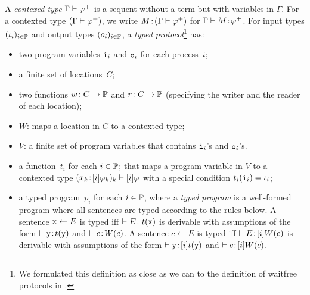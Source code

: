 A \textit{contexed type}
 $\Gamma\vdash{\varphi}^+$ is a sequent without a term but with variables in
 $\Gamma$.
For a contexted type $(\Gamma\vdash{\varphi}^+)$,
we write ${M} \mathord{\colon\kern -2pt}{(\Gamma\vdash{\varphi}^+)}$ for
$\Gamma\vdash{M} \mathord{\colon\kern -2pt}{{\varphi}^+}$.
For input types $(\iota_i)_{i\in\mathbb{P}}$
and output types $(o_i)_{i\in\mathbb{P}}$,
a \textit{typed protocol}\footnote{We formulated this definition
 as close as we can to the definition of waitfree protocols in \citet[\textbf{2.3.}]{saks2000wait}.} has:
\begin{itemize}
 \item two program variables
      $\texttt{i}_i$ and $\texttt{o}_i$ for each process~$i$;
 \item a finite set of locations~$C$;
 \item two functions $w\colon C\rightarrow \mathbb{P}$
       and $r\colon C\rightarrow
       \mathbb{P}$ (specifying the writer and the reader of
       each location);
 \item $W$: maps a location in $C$ to a contexted type;
 \item $V$: a finite set of program variables that contains $\texttt{i}_i$'s
       and $\texttt{o}_i$'s.
 \item a function~$t_i$ for each $i\in \mathbb{P}$;
       that maps a program variable in $V$ to a contexted type
       $({x_k} \mathord{\colon\kern -2pt}{[i]\varphi_k})_k \vdash[i]\varphi$ with a special condition
       $t_i(\texttt{i}_i)= \iota_i$;
 \item a typed program~$p_i$ for each $i\in \mathbb{P}$, where
       a \textit{typed program} is a well-formed
       program where all
       sentences are typed according to the rules below.
       A sentence $\texttt{x} \leftarrow E$ is typed  iff $\vdash E\colon t(\texttt{x})$ is derivable with assumptions of the form $\vdash{\texttt{y}} \mathord{\colon\kern -2pt}{t(\texttt{y})}$ and $\vdash{c} \mathord{\colon\kern -2pt}{W(c)}$.
       A sentence $c\leftarrow E$ is typed iff
       $\vdash{E} \mathord{\colon\kern -2pt}{[i]W(c)}$ is derivable with
       assumptions of the form $\vdash{\texttt{y}} \mathord{\colon\kern -2pt}{[i]t(\texttt{y})}$ and
       $\vdash{c} \mathord{\colon\kern -2pt}{[i]W(c)}$.
\end{itemize}
